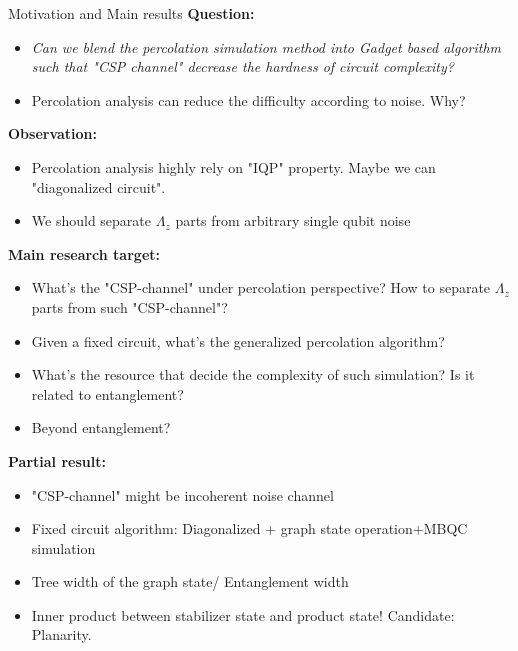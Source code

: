 \documentclass{beamer}
\begin{document}
\begin{frame}[allowframebreaks]{Motivation and Main results}
\textbf{Question:}\\
\begin{itemize}
    \item \textit{Can we blend the percolation simulation method into Gadget based algorithm such that "CSP channel" decrease the hardness of circuit complexity?} 
    \item Percolation analysis can reduce the difficulty according to noise. Why?
\end{itemize}
\textbf{ Observation: }\\
    \begin{itemize}
        \item Percolation analysis highly rely on "IQP" property. Maybe we can "diagonalized circuit".
        \item We should separate $\Lambda_z$ parts from arbitrary single qubit noise

    \end{itemize}
    \newpage
\textbf{   Main research target:}\\
   \begin{itemize}
       \item What's the "CSP-channel" under percolation perspective? How to separate $\Lambda_z$ parts from such "CSP-channel"?
       \item Given a fixed circuit, what's the generalized percolation algorithm?
       \item  What's the resource that decide the complexity of such simulation? Is it related to entanglement?
       \item Beyond entanglement?
   \end{itemize}
\textbf{Partial result:}
\begin{itemize}
    \item "CSP-channel" might be incoherent noise channel
    \item Fixed circuit algorithm: Diagonalized + graph state operation+MBQC simulation
    \item Tree width of the graph state/ Entanglement width
    \item Inner product between stabilizer state and product state! Candidate: Planarity.
\end{itemize}
\end{frame}
\end{document}
